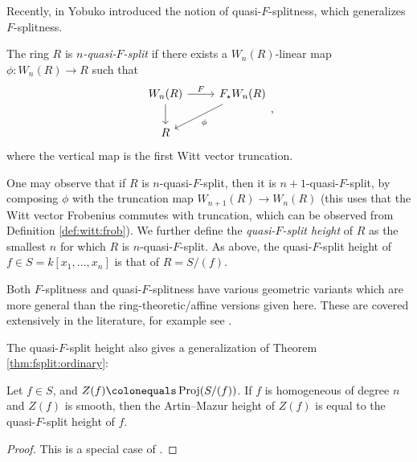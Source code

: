 Recently, in \cite{yobuko-2019-qfs-calabi-yau}
Yobuko introduced the notion of
quasi-\(F\)-splitness, which generalizes \(F\)-splitness.

\begin{defn}
	The ring \(R\) is \textit{\(n\)-quasi-\(F\)-split} if there exists
	a \(W_{n}(R)\)-linear map \(\phi \colon W_{n}(R) \xrightarrow{} R\) such that
	\[
	\begin{tikzcd}
		W_{n}(R) \arrow{r}{F} \arrow{d}[swap]{} &
		F_{\star}W_{n}(R) \arrow{ld}{\phi} \\
	R
	\end{tikzcd}
	,\]
	where the vertical map is the first Witt vector truncation.
\end{defn}

One may observe that if \(R\) is \(n\)-quasi-\(F\)-split,
then it is \(n+1\)-quasi-\(F\)-split, by composing \(\phi\)
with the truncation map \(W_{n+1}(R) \xrightarrow{} W_{n}(R)\)
(this uses that the Witt vector Frobenius commutes with truncation,
which can be observed from Definition \ref{def:witt:frob}).
We further define the \textit{quasi-\(F\)-split height} of \(R\) as the smallest \(n\)
for which \(R\) is \(n\)-quasi-\(F\)-split.
As above, the quasi-\(F\)-split height of
\(f \in S = k[x_{1}, \ldots, x_{n}]\) is that
of \(R = S / (f)\).

\begin{rmk}
	Both \(F\)-splitness and quasi-\(F\)-splitness have
	various geometric
	variants which are more general than the
	ring-theoretic/affine versions given here.
	These are covered extensively in the literature, for example
	see \cite{kttwyy-2022-qfs-birat}.
\end{rmk}

The quasi-\(F\)-split height also gives a generalization
of Theorem \ref{thm:fsplit:ordinary}:

\begin{thm}
	Let \(f \in S\), and
    \(Z(f) \colonequals \Proj (S / (f))\).
	If \(f\) is homogeneous of degree \(n\)
    and \(Z(f)\) is smooth,
	then the Artin--Mazur height of \(Z(f)\)
	is equal to the quasi-\(F\)-split height
	of \(f\).
\end{thm}

\begin{proof}
	This is a special case of \cite[Theorem~4.5]{yobuko-2019-qfs-calabi-yau}.
\end{proof}


